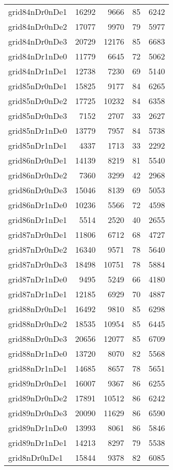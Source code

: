 \documentclass[../../../thesis.tex]{subfiles}
\begin{document}
\begin{longtable}{lrrrr}
grid84nDr0nDe1 & 16292 & 9666 & 85 & 6242 \\
grid84nDr0nDe2 & 17077 & 9970 & 79 & 5977 \\
grid84nDr0nDe3 & 20729 & 12176 & 85 & 6683 \\
grid84nDr1nDe0 & 11779 & 6645 & 72 & 5062 \\
grid84nDr1nDe1 & 12738 & 7230 & 69 & 5140 \\
grid85nDr0nDe1 & 15825 & 9177 & 84 & 6265 \\
grid85nDr0nDe2 & 17725 & 10232 & 84 & 6358 \\
grid85nDr0nDe3 & 7152 & 2707 & 33 & 2627 \\
grid85nDr1nDe0 & 13779 & 7957 & 84 & 5738 \\
grid85nDr1nDe1 & 4337 & 1713 & 33 & 2292 \\
grid86nDr0nDe1 & 14139 & 8219 & 81 & 5540 \\
grid86nDr0nDe2 & 7360 & 3299 & 42 & 2968 \\
grid86nDr0nDe3 & 15046 & 8139 & 69 & 5053 \\
grid86nDr1nDe0 & 10236 & 5566 & 72 & 4598 \\
grid86nDr1nDe1 & 5514 & 2520 & 40 & 2655 \\
grid87nDr0nDe1 & 11806 & 6712 & 68 & 4727 \\
grid87nDr0nDe2 & 16340 & 9571 & 78 & 5640 \\
grid87nDr0nDe3 & 18498 & 10751 & 78 & 5884 \\
grid87nDr1nDe0 & 9495 & 5249 & 66 & 4180 \\
grid87nDr1nDe1 & 12185 & 6929 & 70 & 4887 \\
grid88nDr0nDe1 & 16492 & 9810 & 85 & 6298 \\
grid88nDr0nDe2 & 18535 & 10954 & 85 & 6445 \\
grid88nDr0nDe3 & 20656 & 12077 & 85 & 6709 \\
grid88nDr1nDe0 & 13720 & 8070 & 82 & 5568 \\
grid88nDr1nDe1 & 14685 & 8657 & 78 & 5651 \\
grid89nDr0nDe1 & 16007 & 9367 & 86 & 6255 \\
grid89nDr0nDe2 & 17891 & 10512 & 86 & 6242 \\
grid89nDr0nDe3 & 20090 & 11629 & 86 & 6590 \\
grid89nDr1nDe0 & 13993 & 8061 & 86 & 5846 \\
grid89nDr1nDe1 & 14213 & 8297 & 79 & 5538 \\
grid8nDr0nDe1 & 15844 & 9378 & 82 & 6085 \\

\end{longtable}
\end{document}
